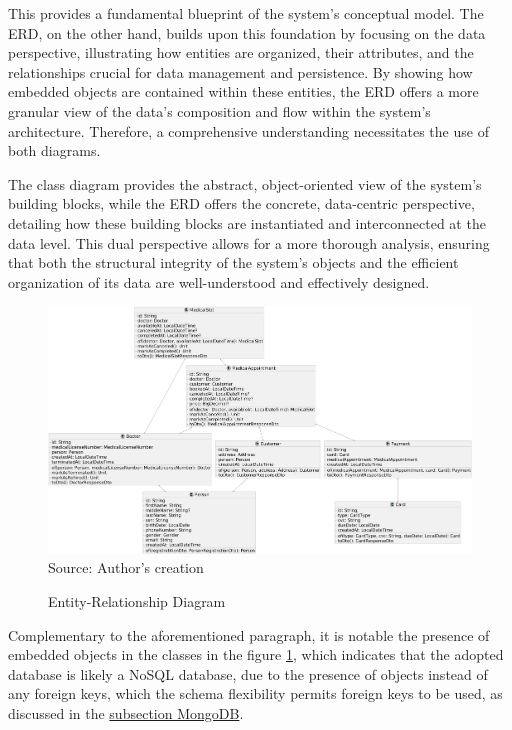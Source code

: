 This provides a fundamental blueprint of the system's conceptual model. The ERD, on the other hand, builds upon this foundation by focusing on the data perspective, illustrating how entities are organized, their attributes, and the relationships crucial for data management and persistence. By showing how embedded objects are contained within these entities, the ERD offers a more granular view of the data's composition and flow within the system's architecture. Therefore, a comprehensive understanding necessitates the use of both diagrams. 

The class diagram provides the abstract, object-oriented view of the system's building blocks, while the ERD offers the concrete, data-centric perspective, detailing how these building blocks are instantiated and interconnected at the data level. This dual perspective allows for a more thorough analysis, ensuring that both the structural integrity of the system's objects and the efficient organization of its data are well-understood and effectively designed.

\begin{landscape}
\begin{figure}[H]
    \caption{Entity-Relationship Diagram}
    \centering
    \includegraphics[width=0.9\linewidth]{figures/erd.png}
    \label{fig:erd}
    \\ \footnotesize Source: Author's creation
\end{figure}
\end{landscape}

Complementary to the aforementioned paragraph, it is notable the presence of embedded objects in the classes in the figure \ref{fig:erd}, which indicates that the adopted database is likely a NoSQL database, due to the presence of objects instead of any foreign keys, which the schema flexibility permits foreign keys to be used, as discussed in the \hyperref[subsection:database]{subsection MongoDB}.

